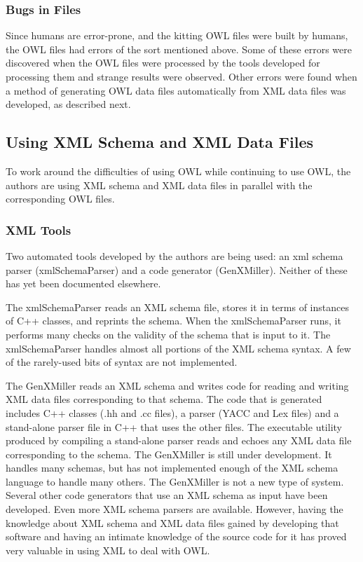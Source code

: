 \subsubsection{Bugs in Files}

Since humans are error-prone, and the kitting OWL files were built by
humans, the OWL files had errors of the sort mentioned above. Some of these
errors were discovered when the OWL files were processed by the tools
developed for processing them and strange results were observed. Other
errors were found when a method of generating OWL data files automatically
from XML data files was developed, as described next.

\subsection{Using XML Schema and XML Data Files}

To work around the difficulties of using OWL while continuing to use OWL,
the authors are using XML schema and XML data files in parallel with the
corresponding OWL files.\\

\subsubsection{XML Tools}

Two automated tools developed by the authors are being used: an xml schema
parser (xmlSchemaParser) and a code generator (GenXMiller).  Neither of
these has yet been documented elsewhere.

The xmlSchemaParser reads an XML schema file, stores it in terms of
instances of C++ classes, and reprints the schema. When the xmlSchemaParser
runs, it performs many checks on the validity of the schema that is input
to it. The xmlSchemaParser handles almost all portions of the XML schema
syntax. A few of the rarely-used bits of syntax are not implemented.

The GenXMiller reads an XML schema and writes code for reading and writing
XML data files corresponding to that schema. The code that is generated
includes C++ classes (.hh and .cc files), a parser (YACC and Lex files) and
a stand-alone parser file in C++ that uses the other files.  The executable
utility produced by compiling a stand-alone parser reads and echoes any XML
data file corresponding to the schema. The GenXMiller is still under
development. It handles many schemas, but has not implemented enough of
the XML schema language to handle many others. The GenXMiller is not a
new type of system. Several other code generators that use an XML schema
as input have been developed. Even more XML schema parsers are
available. However, having the knowledge about XML schema and XML data
files gained by developing that software and having an intimate knowledge
of the source code for it has proved very valuable in using XML to deal
with OWL.

